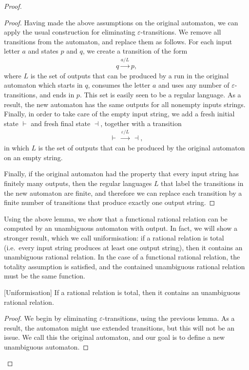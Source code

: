 \begin{proof}
\begin{proof}
        Having made the above assumptions on the original automaton, we can apply the usual construction for eliminating $\varepsilon$-transitions. We remove all transitions from the automaton, and replace them as follows. For each input letter $a$ and states $p$ and $q$, we create a transition of the form   
            \begin{align*}
            q \xrightarrow {a / L} p,
            \end{align*}
            where   $L$ is the set of outputs that can be produced by a run in the original automaton which starts in $q$, consumes the letter $a$ and  uses any number of  $\varepsilon$-transitions, and ends in $p$. This set  is easily seen to be a regular language. As a result, the new automaton has the same outputs for all nonempty inputs strings. Finally, in order to take care of the empty input string, we add a fresh initial state $\vdash$ and fresh final state $\dashv$, together with a transition 
            \begin{align*}
            \vdash\  \xrightarrow {\varepsilon / L }\ \dashv,
            \end{align*}
            in which $L$ is the set of outputs that can be produced by the original automaton on an empty string. 

            Finally, if the original automaton had the property that every input string has finitely many outputs, then the regular languages $L$ that label the transitions in the new automaton are finite, and therefore we can replace each transition by a finite number of transitions that produce exactly one output string. 
        \end{proof}

    Using the above lemma, we show that a functional rational relation can be computed by an unambiguous automaton with output. 
    In fact, we will show a stronger result, which we call uniformisation: if a rational relation is total (i.e.~every input string produces at least one output string), then it contains an unambiguous rational relation. In the case of a functional rational relation, the totality assumption is satisfied, and the contained unambiguous rational relation must be the same function.

    \begin{lemma}\label{lem:uniformisation}
        [Uniformisation] If a rational relation is total, then it contains an unambiguous rational relation.
    \end{lemma}
    \begin{proof}
        We begin by eliminating $\varepsilon$-transitions, using the previous lemma. As a result, the automaton might use extended transitions, but this  will not be an issue. We call this the original automaton, and our goal is to define a new unambiguous automaton. 
        

\end{proof}
\end{proof}
